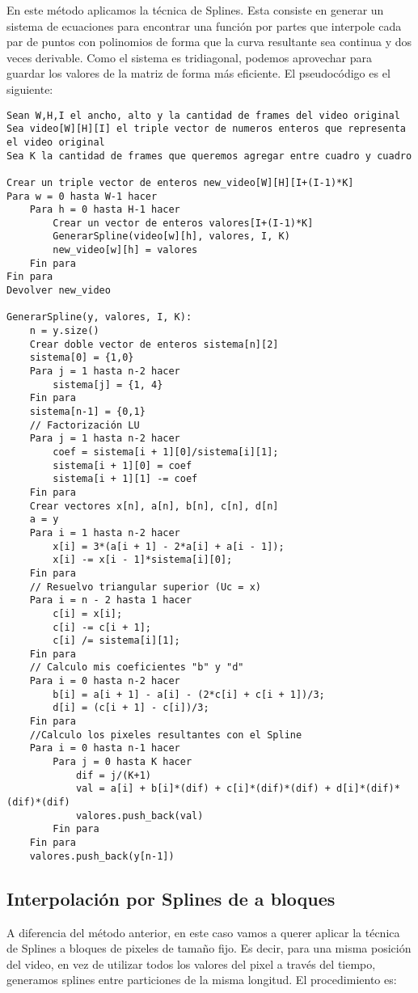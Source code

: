 En este método aplicamos la técnica de Splines. Esta consiste en generar un sistema de ecuaciones para encontrar una función por partes que interpole cada par de puntos con polinomios de forma que la curva resultante sea continua y dos veces derivable. Como el sistema es tridiagonal, podemos aprovechar para guardar los valores de la matriz de forma más eficiente. El pseudocódigo es el siguiente:

\begin{lstlisting}
Sean W,H,I el ancho, alto y la cantidad de frames del video original
Sea video[W][H][I] el triple vector de numeros enteros que representa el video original
Sea K la cantidad de frames que queremos agregar entre cuadro y cuadro

Crear un triple vector de enteros new_video[W][H][I+(I-1)*K]
Para w = 0 hasta W-1 hacer
	Para h = 0 hasta H-1 hacer
		Crear un vector de enteros valores[I+(I-1)*K]
		GenerarSpline(video[w][h], valores, I, K)
		new_video[w][h] = valores
	Fin para
Fin para
Devolver new_video

GenerarSpline(y, valores, I, K):
	n = y.size()
	Crear doble vector de enteros sistema[n][2]
	sistema[0] = {1,0}
	Para j = 1 hasta n-2 hacer
		sistema[j] = {1, 4}
	Fin para
	sistema[n-1] = {0,1}
	// Factorización LU
	Para j = 1 hasta n-2 hacer
		coef = sistema[i + 1][0]/sistema[i][1];
		sistema[i + 1][0] = coef
		sistema[i + 1][1] -= coef
	Fin para
	Crear vectores x[n], a[n], b[n], c[n], d[n]
	a = y
	Para i = 1 hasta n-2 hacer
		x[i] = 3*(a[i + 1] - 2*a[i] + a[i - 1]);
		x[i] -= x[i - 1]*sistema[i][0];
	Fin para
	// Resuelvo triangular superior (Uc = x)
	Para i = n - 2 hasta 1 hacer
		c[i] = x[i];
		c[i] -= c[i + 1];
		c[i] /= sistema[i][1];
	Fin para
	// Calculo mis coeficientes "b" y "d"
	Para i = 0 hasta n-2 hacer
		b[i] = a[i + 1] - a[i] - (2*c[i] + c[i + 1])/3;
		d[i] = (c[i + 1] - c[i])/3;
	Fin para
	//Calculo los pixeles resultantes con el Spline
	Para i = 0 hasta n-1 hacer
		Para j = 0 hasta K hacer
			dif = j/(K+1)
			val = a[i] + b[i]*(dif) + c[i]*(dif)*(dif) + d[i]*(dif)*(dif)*(dif)
			valores.push_back(val)
		Fin para
	Fin para
	valores.push_back(y[n-1])
\end{lstlisting}

\subsection{Interpolación por Splines de a bloques}

A diferencia del método anterior, en este caso vamos a querer aplicar la técnica de Splines a bloques de pixeles de tamaño fijo. Es decir, para una misma posición del video, en vez de utilizar todos los valores del pixel a través del tiempo, generamos splines entre particiones de la misma longitud. El procedimiento es:

